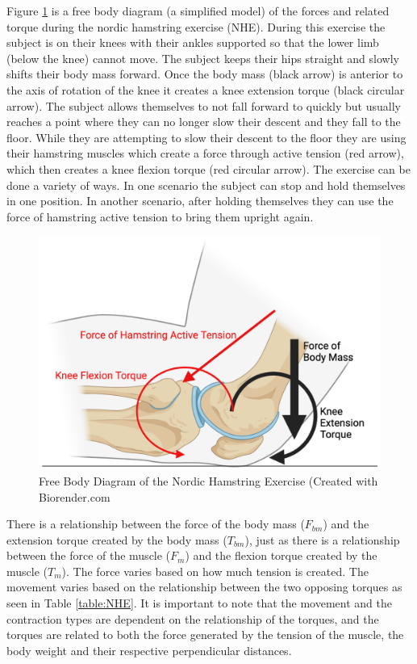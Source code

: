 Figure \ref{fig:free_body_diagram} is a free body diagram (a simplified model) of the forces and related torque during the nordic hamstring exercise (NHE). During this exercise the subject is on their knees with their ankles supported so that the lower limb (below the knee) cannot move. The subject keeps their hips straight and slowly shifts their body mass forward. Once the body mass (black arrow) is anterior to the axis of rotation of the knee it creates a knee extension torque (black circular arrow). The subject allows themselves to not fall forward to quickly but usually reaches a point where they can no longer slow their descent and they fall to the floor. While they are attempting to slow their descent to the floor they are using their hamstring muscles which create a force through active tension (red arrow), which then creates a knee flexion torque (red circular arrow). The exercise can be done a variety of ways. In one scenario the subject can stop and hold themselves in one position. In another scenario, after holding themselves they can use the force of hamstring active tension to bring them upright again. 

\begin{figure}[!ht]
    \centering
    \includegraphics[width=1\linewidth]{./figure/free_body_diagram.png}
    \caption{Free Body Diagram of the Nordic Hamstring Exercise \footnotesize{(Created with Biorender.com}}
    \label{fig:free_body_diagram}
\end{figure}

There is a relationship between the force of the body mass ($F_{bm}$) and the extension torque created by the body mass ($T_{bm}$), just as there is a relationship between the force of the muscle ($F_{m}$) and the flexion torque created by the muscle ($T_{m}$). The force varies based on how much tension is created. The movement varies based on the relationship between the two opposing torques as seen in Table \ref{table:NHE}. It is important to note that the movement and the contraction types are dependent on the relationship of the torques, and the torques are related to both the force generated by the tension of the muscle, the body weight and their respective perpendicular distances.\footnotemark{}

